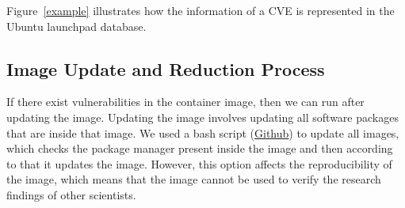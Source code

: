 \documentclass[a4paper,num-refs]{oup-contemporary}
\begin{document}
Figure~\ref{example} illustrates how the information of a CVE is represented
in the Ubuntu launchpad database.






\subsection{Image Update and Reduction Process}

If there exist vulnerabilities in the container image, then we can
run after updating the
image. Updating the image involves updating all software packages that are
inside that image. We used a bash script 
(\href{https://github.com/kaurbhupinder/Vulnerability-Analysis/blob/master/Scripts/update/update.sh}{Github}) 
to update all images, which checks the
package manager present inside the image and then according to that it
updates the image. However, this option affects the reproducibility
of the image, which means that the image cannot be used to verify the research
findings of other scientists.
\end{document}
